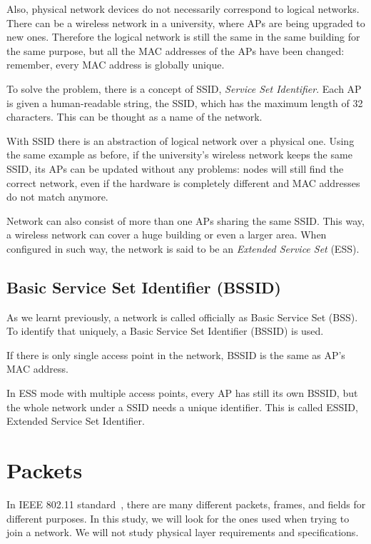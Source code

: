\documentclass[12pt,a4paper,oneside,pdftex]{report}
\begin{document}
Also, physical network devices do not necessarily correspond to logical networks. There can be a wireless network in a university, where APs are being upgraded to new ones. Therefore the logical network is still the same in the same building for the same purpose, but all the MAC addresses of the APs have been changed: remember, every MAC address is globally unique.

To solve the problem, there is a concept of SSID, \emph{Service Set Identifier}. Each AP is given a human-readable string, the SSID, which has the maximum length of 32 characters. This can be thought as a name of the network.

With SSID there is an abstraction of logical network over a physical one. Using the same example as before, if the university's wireless network keeps the same SSID, its APs can be updated without any problems: nodes will still find the correct network, even if the hardware is completely different and MAC addresses do not match anymore.

Network can also consist of more than one APs sharing the same SSID. This way, a wireless network can cover a huge building or even a larger area. When configured in such way, the network is said to be an \emph{Extended Service Set} (ESS).~\cite{IEEE802.11}

\subsection{Basic Service Set Identifier (BSSID)}

As we learnt previously, a network is called officially as Basic Service Set (BSS). To identify that uniquely, a Basic Service Set Identifier (BSSID) is used. 

If there is only single access point in the network, BSSID is the same as AP's MAC address. 

In ESS mode with multiple access points, every AP has still its own BSSID, but the whole network under a SSID needs a unique identifier. This is called ESSID, Extended Service Set Identifier.


\section{Packets}
\label{sec:packets_format}

In IEEE 802.11 standard~\cite{IEEE802.11}, there are many different packets, frames, and fields for different purposes. In this study, we will look for the ones used when trying to join a network. We will not study physical layer requirements and specifications.
\end{document}
